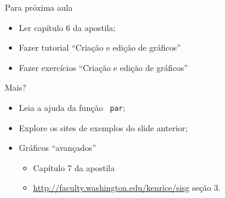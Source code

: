 \documentclass{beamer}
\begin{document}
\begin{frame}{Para próxima aula}

  \begin{itemize}
  \item Ler capítulo 6 da apostila;
  \item Fazer tutorial ``Criação e edição de gráficos''
  \item Fazer exercícios ``Criação e edição de gráficos''
  \end{itemize} \pause
Mais?

\begin{itemize}
\item Leia a ajuda da função \texttt{ par};
\item Explore os sites de exemplos do slide anterior;
\item Gráficos ``avançados''
  \begin{itemize}
  \item Capítulo 7 da apostila
  \item \url{http://faculty.washington.edu/kenrice/sisg} seção 3. 
  \end{itemize}

\end{itemize}
\end{frame}
\end{document}
